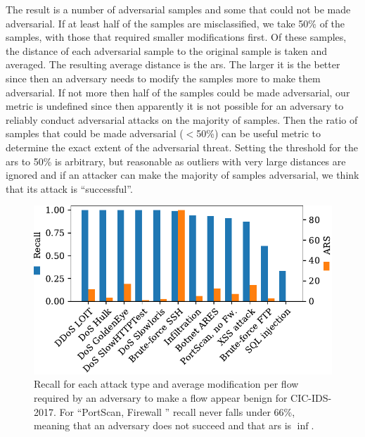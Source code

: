 \documentclass[conference]{IEEEtran}
\begin{document}
The result is a number of adversarial samples and some that could not be made adversarial. If at least half of the samples are misclassified, we take 50\% of the samples, with those that required smaller modifications first. Of these samples, the distance of each adversarial sample to the original sample is taken and averaged. The resulting average distance is the \gls{ars}. The larger it is the better since then an adversary needs to modify the samples more to make them adversarial. If not more then half of the samples could be made adversarial, our metric is undefined since then apparently it is not possible for an adversary to reliably conduct adversarial attacks on the majority of samples. Then the ratio of samples that could be made adversarial ($<$50\%) can be useful metric to determine the exact extent of the adversarial threat. Setting the threshold for the \gls{ars} to 50\% is arbitrary, but
 reasonable as outliers with very large distances are ignored and if an attacker can make the majority of samples adversarial, we think that its attack is ``successful''.

\begin{figure}[h]
\includegraphics[width=\columnwidth]{../plots/ars_original.pdf}
\caption{Recall for each attack type and average modification per flow required by an adversary to make a flow appear benign for CIC-IDS-2017. For ``PortScan, Firewall
'' recall never falls under 66\%, meaning that an adversary does not succeed and that \gls{ars} is $\inf$.}
\label{fig:recall_ars}
\end{figure}
\end{document}
